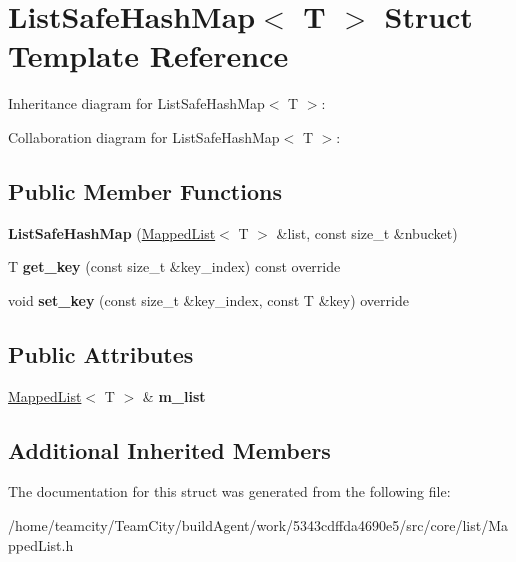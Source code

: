 \hypertarget{structListSafeHashMap}{}\section{List\+Safe\+Hash\+Map$<$ T $>$ Struct Template Reference}
\label{structListSafeHashMap}


Inheritance diagram for List\+Safe\+Hash\+Map$<$ T $>$\+:


Collaboration diagram for List\+Safe\+Hash\+Map$<$ T $>$\+:
\subsection*{Public Member Functions}
\begin{DoxyCompactItemize}
\item 
{\bfseries List\+Safe\+Hash\+Map} (\hyperlink{classMappedList}{Mapped\+List}$<$ T $>$ \&list, const size\+\_\+t \&nbucket)\hypertarget{structListSafeHashMap_a376267a60ed220c7bb61eeb155e8f2d9}{}\label{structListSafeHashMap_a376267a60ed220c7bb61eeb155e8f2d9}

\item 
T {\bfseries get\+\_\+key} (const size\+\_\+t \&key\+\_\+index) const override\hypertarget{structListSafeHashMap_a9165598b25b0120b9ae2be1cb07f81e6}{}\label{structListSafeHashMap_a9165598b25b0120b9ae2be1cb07f81e6}

\item 
void {\bfseries set\+\_\+key} (const size\+\_\+t \&key\+\_\+index, const T \&key) override\hypertarget{structListSafeHashMap_aa3a1d83c5b5de2179969e41eef9ac394}{}\label{structListSafeHashMap_aa3a1d83c5b5de2179969e41eef9ac394}

\end{DoxyCompactItemize}
\subsection*{Public Attributes}
\begin{DoxyCompactItemize}
\item 
\hyperlink{classMappedList}{Mapped\+List}$<$ T $>$ \& {\bfseries m\+\_\+list}\hypertarget{structListSafeHashMap_a5e4a429dca682b116079636a407f0284}{}\label{structListSafeHashMap_a5e4a429dca682b116079636a407f0284}

\end{DoxyCompactItemize}
\subsection*{Additional Inherited Members}


The documentation for this struct was generated from the following file\+:\begin{DoxyCompactItemize}
\item 
/home/teamcity/\+Team\+City/build\+Agent/work/5343cdffda4690e5/src/core/list/Mapped\+List.\+h\end{DoxyCompactItemize}

